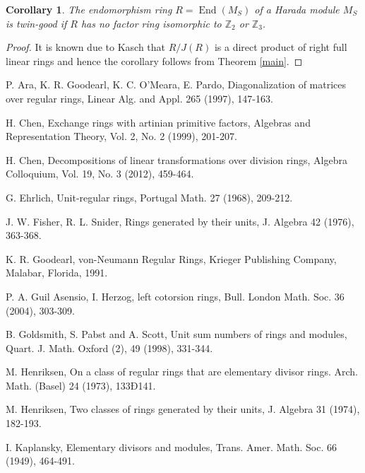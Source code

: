\documentclass{amsart}
\newtheorem{corollary}[theorem]{Corollary}
\begin{document}
\begin{corollary}
The endomorphism ring $R=\operatorname{End}(M_S)$ of a Harada module $M_S$ is twin-good if $R$ has no factor ring isomorphic to $\mathbb{Z}_{2}$ or $\mathbb Z_3$.
\end{corollary}

\begin{proof}
It is known due to Kasch \cite{Kasch} that $R/J(R)$ is a direct product of right full linear rings and hence the corollary follows from Theorem \ref{main}.
\end{proof}

\bigskip

\bigskip

\begin{thebibliography}{99}

P. Ara, K. R. Goodearl, K. C. O'Meara, E. Pardo, Diagonalization of matrices over regular rings, Linear Alg. and Appl. 265 (1997), 147-163.

H. Chen, Exchange rings with artinian primitive factors, Algebras and
Representation Theory, Vol. 2, No. 2 (1999), 201-207.

H. Chen, Decompositions of linear transformations over division rings, Algebra Colloquium, Vol. 19, No. 3 (2012), 459-464.

G. Ehrlich, Unit-regular rings, Portugal Math. 27 (1968), 209-212.

J. W. Fisher, R. L. Snider, Rings generated by their units, J. Algebra
42 (1976), 363-368.

K. R. Goodearl, von-Neumann Regular Rings, Krieger Publishing Company,
Malabar, Florida, 1991.

 P. A. Guil Asensio, I. Herzog, left cotorsion rings, Bull. London Math.
Soc. 36 (2004), 303-309.

B. Goldsmith, S. Pabst and A. Scott, Unit sum numbers of rings and modules, Quart. J. Math. Oxford (2), 49 (1998), 331-344.

M. Henriksen, On a class of regular rings that are elementary divisor rings. Arch. Math. (Basel) 24 (1973), 133Ð141.

M. Henriksen, Two classes of rings generated by their units, J. Algebra
31 (1974), 182-193.

I. Kaplansky, Elementary divisors and modules, Trans. Amer. Math. Soc. 66 (1949), 464-491.


\end{thebibliography}
\end{document}
